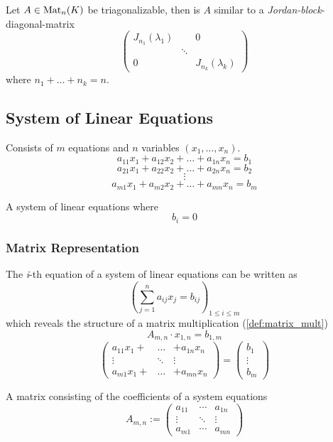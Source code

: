 \begin{corollary}
   Let \(A \in \operatorname{Mat}_n(K)\) be triagonalizable, then is \(A\) similar to a \emph{Jordan-block}-diagonal-matrix
   \[\begin{pmatrix}J_{n_1}(\lambda_1) & & 0\\ & \ddots & \\ 0 & & J_{n_k}(\lambda_k)\end{pmatrix}\]
   where \(n_1 + \ldots + n_k = n\).
\end{corollary}

\subsection{System of Linear Equations}
\begin{definition}\label{def:sys_lin_eq}
   Consists of \(m\) equations and \(n\) variables \((x_1, \ldots, x_n)\).
   \[a_{11} x_1 + a_{12} x_2 + \ldots + a_{1n} x_n = b_1\]
   \[a_{21} x_1 + a_{22} x_2 + \ldots + a_{2n} x_n = b_2\]
   \[\vdots\]
   \[a_{m1} x_1 + a_{m2} x_2 + \ldots + a_{mn} x_n = b_m\]
\end{definition}

\begin{definition}
   A system of linear equations where
   \[b_i = 0\]
\end{definition}

\subsubsection{Matrix Representation}
The \textit{i}-th equation of a system of linear equations can be written as
\[\left(\displaystyle\sum_{j=1}^n a_{ij} x_j = b_{ij}\right)_{1 \leq i \leq m}\]
which reveals the structure of a matrix multiplication (\ref{def:matrix_mult})
\[A_{m,n} \cdot x_{1,n} = b_{1,m}\]
\[\begin{pmatrix} a_{11} x_1 + & \ldots & + a_{1n} x_n \\ \vdots & \ddots & \vdots \\ a_{m1} x_1 + & \ldots & + a_{mn} x_n\end{pmatrix} = \begin{pmatrix} b_1 \\ \vdots \\ b_m \end{pmatrix}\]

\begin{definition}
   A matrix consisting of the coefficients of a system equations
   \[A_{m,n} := \begin{pmatrix} a_{11} & \cdots & a_{1n} \\ \vdots & \ddots & \vdots \\ a_{m1} & \cdots & a_{mn}\end{pmatrix}\]
\end{definition}

